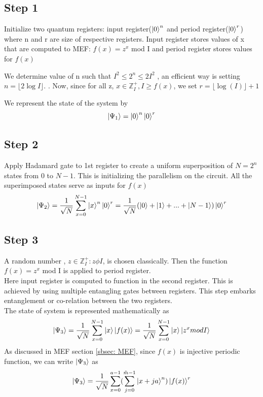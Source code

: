 \subsection{Step 1}
Initialize two quantum registers: input register($\ket{0}^n$ and period register($\ket{0}^r$) where n and r are size of respective registers. Input register stores values of x that are computed to \acrshort{MEF}: $f(x)= z^x$ mod I and period register stores values  for $f(x)$

We determine value of n such that $I^2 \leq 2^n \leq 2I^2$ \cite{loceff2015}, an efficient way is setting $n= \lfloor 2\log I \rfloor$. \cite{chen20007}. Now, since for all z, $x \in \mathbb{Z}_I ^+, I \geq f(x) $, we set $r = \lfloor \log(I) \rfloor + 1 $

We represent the state of the system by
\begin{equation}
    \ket{\Psi_1} = \ket{0}^n \ket{0}^r
\end{equation}

\subsection{Step 2 }
Apply Hadamard gate to 1st register to create a uniform superposition of $N =2^n$ states from 0 to $N-1$. This is initializing the parallelism on the circuit. All the superimposed states serve as inputs for $f(x)$
\begin{equation}
    \ket{\Psi_2} = \frac{1}{\sqrt{N}} \sum_{x=0} ^{N-1} \ket{x}^n \ket{0}^r = \frac{1}{\sqrt{N}} (\ket{0} + \ket{1} + . . . + \ket{N-1}) \ket{0}^r
\end{equation}

\subsection{Step 3}
A random number , $z \in \mathbb{Z}_I ^+ : z \phi I$, is chosen classically. Then the function $f(x) = z^x$ mod I is applied to period register.
\\Here input register is computed to function in the second register. This is achieved by using multiple entangling gates between registers. This step embarks entanglement or co-relation between the two registers.
\\The state of system is represented mathematically as \begin{equation*}
    \ket{\Psi_3} = \frac{1}{\sqrt{N}} \sum_{x=0} ^ {N-1} \ket{x} \ket{f(x)} = \frac{1}{\sqrt{N}} \sum_{x=0} ^ {N-1} \ket{x} \ket{z^x mod I}
\end{equation*}
As discussed in \acrshort{MEF} section \ref{sbsec: MEF}, since $f(x)$ is injective periodic function, we can write $\ket{\Psi_3}$ as 
\begin{equation}
    \ket{\Psi_3} = \frac{1}{\sqrt{N}} \sum_{x=0} ^{a-1} (\sum_{j=0}^{\Tilde{m} - 1} \ket{x + j a}^n ) \ket{f(x)}^r
\end{equation}

